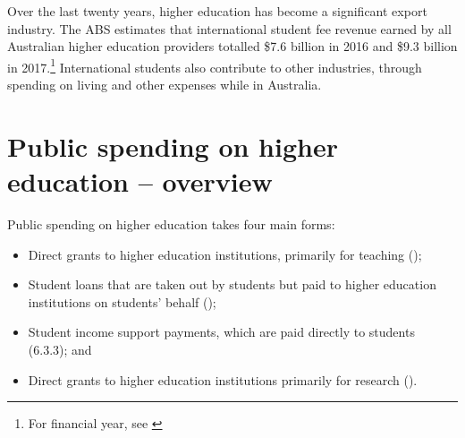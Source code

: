 \documentclass{grattan}
\begin{document}
Over the last twenty years, higher education has become a significant export industry. The ABS estimates that international student fee revenue earned by all Australian higher education providers totalled \$7.6 billion in 2016 and \$9.3 billion in 2017.\footnote{\textcite[][table~9.]{ABS2018internationaltrade} For financial year, see \textcite[][table~9.]{ABS2017internationaltrade}} International students also contribute to other industries, through spending on living and other expenses while in Australia.

%
\section{Public spending on higher education -- overview}\label{sec:public-spending-on-higher-education-overview}

Public spending on higher education takes four main forms:

\begin{itemize}
\item
  Direct grants to higher education institutions, primarily for teaching ();
\item
  Student loans that are taken out by students but paid to higher education institutions on students' behalf ();
\item
  Student income support payments, which are paid directly to students (6.3.3); and
\item
  Direct grants to higher education institutions primarily for research ().
\end{itemize}
\end{document}
